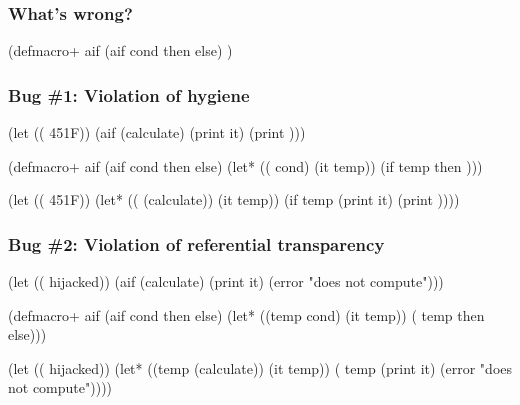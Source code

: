 \documentclass[hyperref={bookmarks=false}]{beamer}
\begin{document}
\begin{frame}[fragile]
\frametitle{What's wrong?}
\begin{semiverbatim}

(defmacro+ aif
  (aif cond then else)
    )

\end{semiverbatim}
\end{frame}

\begin{frame}[fragile]
\frametitle{Bug \#1: Violation of hygiene}
\begin{semiverbatim}
(let ((\text{\color{blue}{temp}} 451{\textdegree}F))
  (aif (calculate)
    (print it)
    (print \text{\color{blue}{temp}})))

(defmacro+ aif
  (aif cond then else)
  (let* ((\text{\color{red}{temp}} cond)
         (it temp))
    (if temp then \text{\color{red}{else}})))

(let ((\text{\color{blue}{temp}} 451{\textdegree}F))
  (let* ((\text{\color{red}{temp}} (calculate))
         (it temp))
    (if temp
      (print it)
      (print \text{\color{red}{temp}}))))
\end{semiverbatim}
\end{frame}

\begin{frame}[fragile]
\frametitle{Bug \#2: Violation of referential transparency}
\begin{semiverbatim}
(let ((\text{\color{blue}{if}} hijacked))
  (aif (calculate)
    (print it)
    (error "does not compute")))

(defmacro+ aif
  (aif cond then else)
  (let* ((temp cond)
         (it temp))
    (\text{\color{red}{if}} temp then else)))

(let ((\text{\color{blue}{if}} hijacked))
  (let* ((temp (calculate))
         (it temp))
    (\text{\color{blue}{if}} temp
      (print it)
      (error "does not compute"))))
\end{semiverbatim}
\end{frame}
\end{document}
